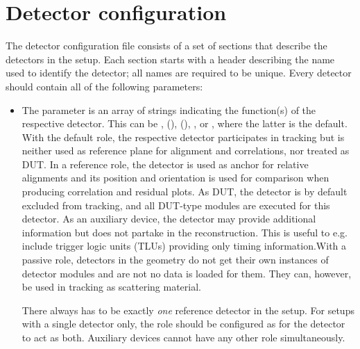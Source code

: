 \section{Detector configuration}
\label{sec:detector_config}
The detector configuration file consists of a set of sections that describe the detectors in the setup.
Each section starts with a header describing the name used to identify the detector; all names are required to be unique.
Every detector should contain all of the following parameters:
\begin{itemize}
\item The  parameter is an array of strings indicating the function(s) of the respective detector. This can be ,  (),  (), , or , where the latter is the default. With the default role, the respective detector participates in tracking but is neither used as reference plane for alignment and correlations, nor treated as DUT. In a reference role, the detector is used as anchor for relative alignments and its position and orientation is used for comparison when producing correlation and residual plots. As DUT, the detector is by default excluded from tracking, and all DUT-type modules are executed for this detector. As an auxiliary device, the detector may provide additional information but does not partake in the reconstruction. This is useful to e.g. include trigger logic units (TLUs) providing only timing information.With a passive role, detectors in the geometry do not get their own instances of detector modules and are not no data is loaded for them. They can, however, be used in tracking as scattering material.
\begin{warning}
There always has to be exactly \emph{one} reference detector in the setup. For setups with a single detector only, the role should be configured as  for the detector to act as both. Auxiliary devices cannot have any other role simultaneously.
\end{warning}


\end{itemize}
